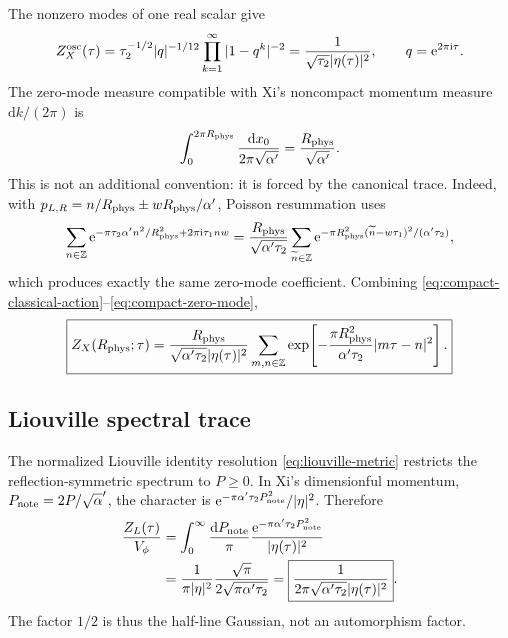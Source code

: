 \documentclass[11pt]{article}
\numberwithin{equation}{section}
\newcommand{\A}{\alpha'}
\newcommand{\dd}{\mathrm d}
\newcommand{\ee}{\mathrm e}
\newcommand{\ii}{\mathrm i}
\begin{document}
The nonzero modes of one real scalar give
\begin{equation}
 Z_X^{\rm osc}(\tau)
 =\tau_2^{-1/2}|q|^{-1/12}
 \prod_{k=1}^\infty|1-q^k|^{-2}
 =\frac1{\sqrt{\tau_2}|\eta(\tau)|^2},
 \qquad q=\ee^{2\pi\ii\tau}.
 \label{eq:compact-oscillator}
\end{equation}
The zero-mode measure compatible with Xi's noncompact momentum measure
$\dd k/(2\pi)$ is
\begin{equation}
 \int_0^{2\pi R_{\rm phys}}\frac{\dd x_0}{2\pi\sqrt{\A}}
 =\frac{R_{\rm phys}}{\sqrt{\A}}.
 \label{eq:compact-zero-mode}
\end{equation}
This is not an additional convention: it is forced by the canonical trace.
Indeed, with
$p_{L,R}=n/R_{\rm phys}\pm wR_{\rm phys}/\A$, Poisson resummation uses
\begin{equation}
 \sum_{n\in\mathbb Z}
 \ee^{-\pi\tau_2\A n^2/R_{\rm phys}^2+2\pi\ii\tau_1nw}
 =\frac{R_{\rm phys}}{\sqrt{\A\tau_2}}
 \sum_{\widetilde n\in\mathbb Z}
 \ee^{-\pi R_{\rm phys}^2(\widetilde n-w\tau_1)^2/(\A\tau_2)},
 \label{eq:torus-poisson}
\end{equation}
which produces exactly the same zero-mode coefficient.  Combining
\eqref{eq:compact-classical-action}--\eqref{eq:compact-zero-mode},
\begin{equation}
 \boxed{
 Z_X(R_{\rm phys};\tau)
 =\frac{R_{\rm phys}}
 {\sqrt{\A\tau_2}|\eta(\tau)|^2}
 \sum_{m,n\in\mathbb Z}
 \exp\!\left[-\frac{\pi R_{\rm phys}^2}{\A\tau_2}
 |m\tau-n|^2\right].}
 \label{eq:compact-torus}
\end{equation}

\subsection{Liouville spectral trace}

The normalized Liouville identity resolution \eqref{eq:liouville-metric}
restricts the reflection-symmetric spectrum to $P\geq0$.  In Xi's dimensionful
momentum, $P_{\rm note}=2P/\sqrt\A$, the character is
$\ee^{-\pi\A\tau_2P_{\rm note}^2}/|\eta|^2$.  Therefore
\begin{align}
 \frac{Z_L(\tau)}{V_\phi}
 &=\int_0^\infty\frac{\dd P_{\rm note}}{\pi}
 \frac{\ee^{-\pi\A\tau_2P_{\rm note}^2}}
 {|\eta(\tau)|^2} \notag\\
 &=\frac1{\pi|\eta|^2}
 \frac{\sqrt\pi}{2\sqrt{\pi\A\tau_2}}
 =\boxed{\frac1{2\pi\sqrt{\A\tau_2}|\eta(\tau)|^2}}.
 \label{eq:liouville-torus}
\end{align}
The factor $1/2$ is thus the half-line Gaussian, not an automorphism factor.
\end{document}
